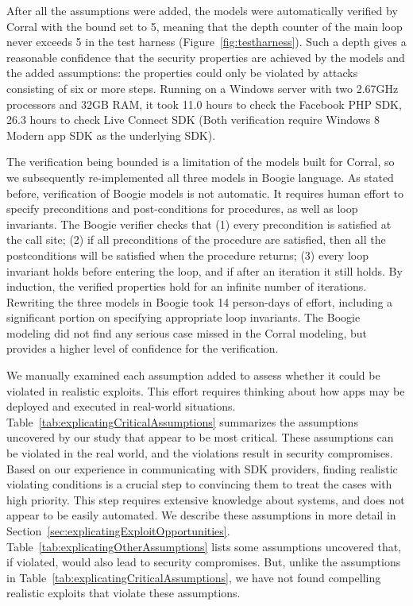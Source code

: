   After all the assumptions were added, the models were automatically verified by Corral with the bound set to 5, meaning that the depth counter of the main loop never exceeds 5 in the test harness (Figure~\ref{fig:testharness}).  Such a depth gives a reasonable confidence that the security properties are achieved by the models and the added assumptions: the properties could only be violated by attacks consisting of six or more steps. Running on a Windows server with two 2.67GHz processors and 32GB RAM, it took 11.0 hours to check the Facebook PHP SDK, 26.3 hours to check Live Connect SDK (Both verification require Windows 8 Modern app SDK as the underlying SDK).

  The verification being bounded is a limitation of the models built for Corral, so we subsequently re-implemented all three models in Boogie language.  As stated before, verification of Boogie models is not automatic.  It requires human effort to specify preconditions and post-conditions for procedures, as well as loop invariants.  The Boogie verifier checks that (1) every precondition is satisfied at the call site; (2) if all preconditions of the procedure are satisfied, then all the postconditions will be satisfied when the procedure returns; (3) every loop invariant holds before entering the loop, and if after an iteration it still holds.  By induction, the verified properties hold for an infinite number of iterations. Rewriting the three models in Boogie took 14 person-days of effort, including a significant portion on specifying appropriate loop invariants.  The Boogie modeling did not find any serious case missed in the Corral modeling, but provides a higher level of confidence for the verification.



  We manually examined each assumption added to assess whether it could be violated in realistic exploits.  This effort requires thinking about how apps may be deployed and executed in real-world situations.  Table~\ref{tab:explicatingCriticalAssumptions} summarizes the assumptions uncovered by our study that appear to be most critical.  These assumptions can be violated in the real world, and the violations result in security compromises.  Based on our experience in communicating with SDK providers, finding realistic violating conditions is a crucial step to convincing them to treat the cases with high priority.  This step requires extensive knowledge about systems, and does not appear to be easily automated.  We describe these assumptions in more detail in Section~\ref{sec:explicatingExploitOpportunities}.  Table~\ref{tab:explicatingOtherAssumptions} lists some assumptions uncovered that, if violated, would also lead to security compromises.  But, unlike the assumptions in Table~\ref{tab:explicatingCriticalAssumptions}, we have not found compelling realistic exploits that violate these assumptions.  

